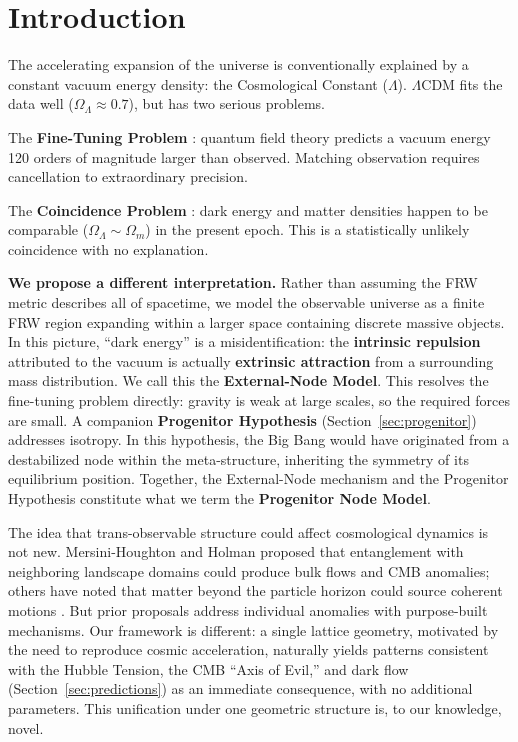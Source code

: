 \documentclass{article}
\begin{document}
\section{Introduction}
\label{sec:intro}

The accelerating expansion of the universe \cite{Riess1998, Perlmutter1999} is conventionally explained by a constant vacuum energy density: the Cosmological Constant ($\Lambda$).
$\Lambda$CDM fits the data well ($\Omega_\Lambda \approx 0.7$), but has two serious problems.

The \textbf{Fine-Tuning Problem} \cite{Weinberg1989}: quantum field theory predicts a vacuum energy 120 orders of magnitude larger than observed.
Matching observation requires cancellation to extraordinary precision.

The \textbf{Coincidence Problem} \cite{Steinhardt1999}: dark energy and matter densities happen to be comparable ($\Omega_\Lambda \sim \Omega_m$) in the present epoch. This is a statistically unlikely coincidence with no explanation.

\textbf{We propose a different interpretation.} Rather than assuming the FRW metric describes all of spacetime, we model the observable universe as a finite FRW region expanding within a larger space containing discrete massive objects.
In this picture, ``dark energy'' is a misidentification: the \textbf{intrinsic repulsion} attributed to the vacuum is actually \textbf{extrinsic attraction} from a surrounding mass distribution.
We call this the \textbf{External-Node Model}.
This resolves the fine-tuning problem directly: gravity is weak at large scales, so the required forces are small.
A companion \textbf{Progenitor Hypothesis} (Section~\ref{sec:progenitor}) addresses isotropy. In this hypothesis, the Big Bang would have originated from a destabilized node within the meta-structure, inheriting the symmetry of its equilibrium position.
Together, the External-Node mechanism and the Progenitor Hypothesis constitute what we term the \textbf{Progenitor Node Model}.

The idea that trans-observable structure could affect cosmological dynamics is not new.
Mersini-Houghton and Holman \cite{MersiniHoughton2009} proposed that entanglement with neighboring landscape domains could produce bulk flows and CMB anomalies; others have noted that matter beyond the particle horizon could source coherent motions \cite{Kashlinsky2008}.
But prior proposals address individual anomalies with purpose-built mechanisms.
Our framework is different: a single lattice geometry, motivated by the need to reproduce cosmic acceleration, naturally yields patterns consistent with the Hubble Tension, the CMB ``Axis of Evil,'' and dark flow (Section~\ref{sec:predictions}) as an immediate consequence, with no additional parameters. This unification under one geometric structure is, to our knowledge, novel.
\end{document}
